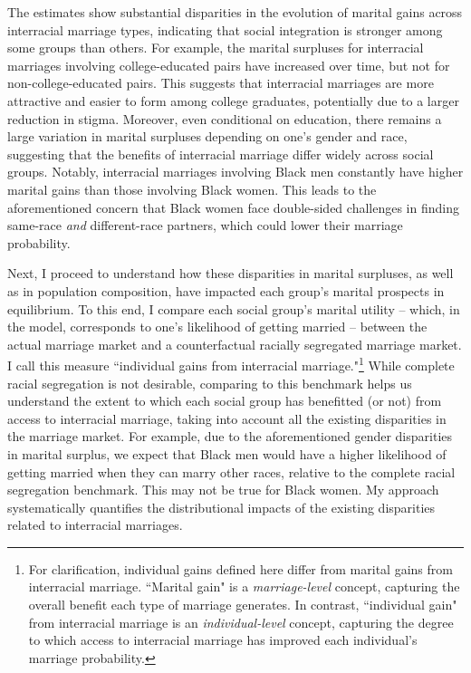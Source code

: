 

The estimates show substantial disparities in the evolution of marital gains across interracial marriage types, indicating that social integration is stronger among some groups than others. For example, the marital surpluses for interracial marriages involving college-educated pairs have increased over time, but not for non-college-educated pairs. This suggests that interracial marriages are more attractive and easier to form among college graduates, potentially due to a larger reduction in stigma. Moreover, even conditional on education, there remains a large variation in marital surpluses depending on one's gender and race, suggesting that the benefits of interracial marriage differ widely across social groups. Notably, interracial marriages involving Black men constantly have higher marital gains than those involving Black women.  This leads to the aforementioned concern that Black women face double-sided challenges in finding same-race \textit{and} different-race partners, which could lower their marriage probability. 

Next, I proceed to understand how these disparities in marital surpluses, as well as in population composition, have impacted each group's marital prospects in equilibrium. To this end, I compare each social group's marital utility -- which, in the model, corresponds to one's likelihood of getting married -- between the actual marriage market and a counterfactual racially segregated marriage market. I call this measure ``individual gains from interracial marriage."\footnote{For clarification, individual gains defined here differ from marital gains from interracial marriage. ``Marital gain" is a \textit{marriage-level} concept, capturing the overall benefit each type of marriage generates. In contrast, ``individual gain" from interracial marriage is an \textit{individual-level} concept, capturing the degree to which access to interracial marriage has improved each individual's marriage probability.} While complete racial segregation is not desirable, comparing to this benchmark helps us understand the extent to which each social group has benefitted (or not) from access to interracial marriage, taking into account all the existing disparities in the marriage market. For example, due to the aforementioned gender disparities in marital surplus, we expect that Black men would have a higher likelihood of getting married when they can marry other races, relative to the complete racial segregation benchmark. This may not be true for Black women. My approach systematically quantifies the distributional impacts of the existing disparities related to interracial marriages. 
 

